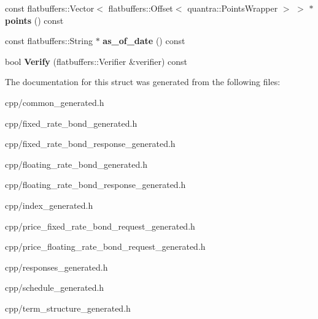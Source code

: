 \begin{DoxyCompactItemize}
\item 
\mbox{\label{structquantra_1_1FLATBUFFERS__FINAL__CLASS_a60ed3de828a6359cd86219a5e7844de6}} 
const flatbuffers\+::\+Vector$<$ flatbuffers\+::\+Offset$<$ quantra\+::\+Points\+Wrapper $>$ $>$ $\ast$ {\bfseries points} () const
\item 
\mbox{\label{structquantra_1_1FLATBUFFERS__FINAL__CLASS_a565651032145f0eb99a6f0c9b32d7fd0}} 
const flatbuffers\+::\+String $\ast$ {\bfseries as\+\_\+of\+\_\+date} () const
\item 
\mbox{\label{structquantra_1_1FLATBUFFERS__FINAL__CLASS_aed693ee5a45b5f53af7411f9cab6793a}} 
bool {\bfseries Verify} (flatbuffers\+::\+Verifier \&verifier) const
\end{DoxyCompactItemize}


The documentation for this struct was generated from the following files\+:\begin{DoxyCompactItemize}
\item 
cpp/common\+\_\+generated.\+h\item 
cpp/fixed\+\_\+rate\+\_\+bond\+\_\+generated.\+h\item 
cpp/fixed\+\_\+rate\+\_\+bond\+\_\+response\+\_\+generated.\+h\item 
cpp/floating\+\_\+rate\+\_\+bond\+\_\+generated.\+h\item 
cpp/floating\+\_\+rate\+\_\+bond\+\_\+response\+\_\+generated.\+h\item 
cpp/index\+\_\+generated.\+h\item 
cpp/price\+\_\+fixed\+\_\+rate\+\_\+bond\+\_\+request\+\_\+generated.\+h\item 
cpp/price\+\_\+floating\+\_\+rate\+\_\+bond\+\_\+request\+\_\+generated.\+h\item 
cpp/responses\+\_\+generated.\+h\item 
cpp/schedule\+\_\+generated.\+h\item 
cpp/term\+\_\+structure\+\_\+generated.\+h\end{DoxyCompactItemize}
